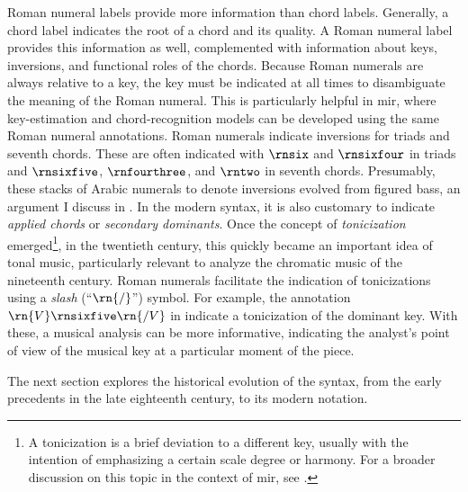 

Roman numeral labels provide more information than chord
labels. Generally, a chord label indicates the root of a
chord and its quality. A Roman numeral label provides this
information as well, complemented with information about
keys, inversions, and functional roles of the chords.
Because Roman numerals are always relative to a key, the key
must be indicated at all times to disambiguate the meaning
of the Roman numeral. This is particularly helpful in
\gls{mir}, where key-estimation and chord-recognition models
can be developed using the same Roman numeral annotations.
Roman numerals indicate inversions for triads and seventh
chords. These are often indicated with $\rnsix$ and
$\rnsixfour$ in triads and $\rnsixfive$, $\rnfourthree$, and
$\rntwo$ in seventh chords. Presumably, these stacks of
Arabic numerals to denote inversions evolved from figured
bass, an argument I discuss in
. In the modern
syntax, it is also customary to indicate \emph{applied
chords} or \emph{secondary dominants}. Once the concept of
\emph{tonicization} emerged\footnote{A tonicization is a
brief deviation to a different key, usually with the
intention of emphasizing a certain scale degree or harmony.
For a broader discussion on this topic in the context of
\gls{mir}, see \textcite{napoleslopez2020local}.}, in the
twentieth century, this quickly became an important idea of
tonal music, particularly relevant to analyze the chromatic
music of the nineteenth century. Roman numerals facilitate
the indication of tonicizations using a \emph{slash}
(``$\rn{/}$'') symbol. For example, the annotation
$\rn{V}\rnsixfive\rn{/V}$ in  indicate a
tonicization of the dominant key. With these, a musical
analysis can be more informative, indicating the analyst's
point of view of the musical key at a particular moment of
the piece.

The next section explores the historical evolution of the
syntax, from the early precedents in the late eighteenth
century, to its modern notation.

